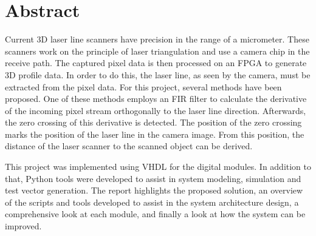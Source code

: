 \chapter{Abstract}\label{Abstract}

Current 3D laser line scanners have precision in the range of a micrometer. These scanners work on the principle of laser triangulation and use a camera chip in the receive path. The captured pixel data is then processed on an FPGA to generate 3D profile data. In order to do this, the laser line, as seen by the camera, must be extracted from the pixel data. For this project, several methods have been proposed. One of these methods employs an FIR filter to calculate the derivative of the incoming pixel stream orthogonally to the laser line direction. Afterwards, the zero crossing of this derivative is detected. The position of the zero crossing marks the position of the laser line in the camera image. From this position, the distance of the laser scanner to the scanned object can be derived.

This project was implemented using VHDL for the digital modules. In addition to that, Python tools were developed to assist in system modeling, simulation and test vector generation. The report highlights the proposed solution, an overview of the scripts and tools developed to assist in the system architecture design, a comprehensive look at each module, and finally a look at how the system can be improved.
